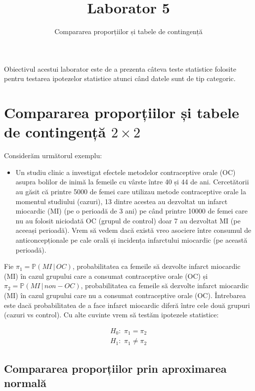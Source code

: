 \documentclass[]{article}
\title{Laborator 5}
\subtitle{Compararea proporțiilor și tabele de contingență}
\author{}
\date{}
\newenvironment{frshaded*}{%
  \def\FrameCommand{\fboxrule=\FrameRule\fboxsep=\FrameSep \fcolorbox{framecolor}{shadecolor1}}%
  \MakeFramed {\advance\hsize-\width \FrameRestore}}%
{\endMakeFramed}
\newenvironment{rmdblock}[1]
  {\begin{frshaded*}
  \begin{itemize}
  \renewcommand{\labelitemi}{
    \raisebox{-.7\height}[0pt][0pt]{
      {\setkeys{Gin}{width=2em,keepaspectratio}\texttt{[image: images/icons/\#1]}}
    }
  }
  \item
  }
  {
  \end{itemize}
  \end{frshaded*}
  }
\newenvironment{rmdexercise}
  {\begin{rmdblock}{exercise}}
  {\end{rmdblock}}
\begin{document}
\maketitle

\thispagestyle{fancy}

Obiectivul acestui laborator este de a prezenta câteva teste statistice
folosite pentru testarea ipotezelor statistice atunci când datele sunt
de tip categoric.

\section{\texorpdfstring{Compararea proporțiilor și tabele de
contingență
\(2\times 2\)}{Compararea proporțiilor și tabele de contingență 2\textbackslash{}times 2}}\label{compararea-proportiilor-si-tabele-de-contingenta-2times-2}

Considerăm următorul exemplu:

\begin{rmdexercise}
Un studiu clinic a investigat efectele metodelor contraceptive orale
(OC) asupra bolilor de inimă la femeile cu vârste între 40 și 44 de ani.
Cercetătorii au găsit că printre 5000 de femei care utilizau metode
contraceptive orale la momentul studiului (cazuri), 13 dintre acestea au
dezvoltat un infarct miocardic (MI) (pe o perioadă de 3 ani) pe când
printre 10000 de femei care nu au folosit niciodată OC (grupul de
control) doar 7 au dezvoltat MI (pe aceeași perioadă). Vrem să vedem
dacă există vreo asociere între consumul de anticoncepționale pe cale
orală și incidența infarctului miocardic (pe această perioadă).
\end{rmdexercise}

Fie \(\pi_1=\mathbb{P}(MI\,|\,OC)\), probabilitatea ca femeile să
dezvolte infarct miocardic (MI) în cazul grupului care a consumat
contraceptive orale (OC) și \(\pi_2=\mathbb{P}(MI\,|\,non-OC)\),
probabilitatea ca femeile să dezvolte infarct miocardic (MI) în cazul
grupului care nu a consumat contraceptive orale (OC). Întrebarea este
dacă probabilitatea de a face infarct miocardic diferă între cele două
grupuri (cazuri vs control). Cu alte cuvinte vrem să testăm ipotezele
statistice:

\[
  \begin{array}{ll}
    H_0:\,\,\pi_1=\pi_2\\
    H_1:\,\,\pi_1\neq \pi_2
  \end{array}
\]

\subsection{Compararea proporțiilor prin aproximarea
normală}\label{compararea-proportiilor-prin-aproximarea-normala}
\end{document}
